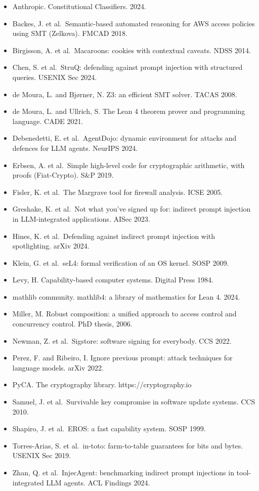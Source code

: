 \begin{itemize}
\tightlist
\item
  Anthropic. Constitutional Classifiers. 2024.
\item
  Backes, J. et al.~Semantic-based automated reasoning for AWS access
  policies using SMT (Zelkova). FMCAD 2018.
\item
  Birgisson, A. et al.~Macaroons: cookies with contextual caveats. NDSS
  2014.
\item
  Chen, S. et al.~StruQ: defending against prompt injection with
  structured queries. USENIX Sec 2024.
\item
  de Moura, L. and Bjørner, N. Z3: an efficient SMT solver. TACAS 2008.
\item
  de Moura, L. and Ullrich, S. The Lean 4 theorem prover and programming
  language. CADE 2021.
\item
  Debenedetti, E. et al.~AgentDojo: dynamic environment for attacks and
  defences for LLM agents. NeurIPS 2024.
\item
  Erbsen, A. et al.~Simple high-level code for cryptographic arithmetic,
  with proofs (Fiat-Crypto). S\&P 2019.
\item
  Fisler, K. et al.~The Margrave tool for firewall analysis. ICSE 2005.
\item
  Greshake, K. et al.~Not what you've signed up for: indirect prompt
  injection in LLM-integrated applications. AISec 2023.
\item
  Hines, K. et al.~Defending against indirect prompt injection with
  spotlighting. arXiv 2024.
\item
  Klein, G. et al.~seL4: formal verification of an OS kernel. SOSP 2009.
\item
  Levy, H. Capability-based computer systems. Digital Press 1984.
\item
  mathlib community. mathlib4: a library of mathematics for Lean 4.
  2024.
\item
  Miller, M. Robust composition: a unified approach to access control
  and concurrency control. PhD thesis, 2006.
\item
  Newman, Z. et al.~Sigstore: software signing for everybody. CCS 2022.
\item
  Perez, F. and Ribeiro, I. Ignore previous prompt: attack techniques
  for language models. arXiv 2022.
\item
  PyCA. The cryptography library. https://cryptography.io
\item
  Samuel, J. et al.~Survivable key compromise in software update
  systems. CCS 2010.
\item
  Shapiro, J. et al.~EROS: a fast capability system. SOSP 1999.
\item
  Torres-Arias, S. et al.~in-toto: farm-to-table guarantees for bits and
  bytes. USENIX Sec 2019.
\item
  Zhan, Q. et al.~InjecAgent: benchmarking indirect prompt injections in
  tool-integrated LLM agents. ACL Findings 2024.
\end{itemize}

